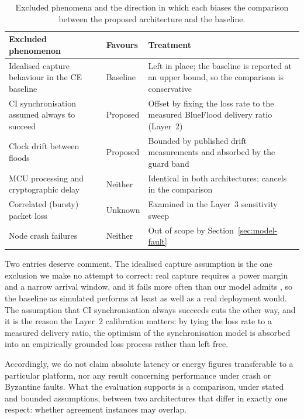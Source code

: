 \documentclass[journal]{IEEEtran}
\newcommand{\CI}{CI}                      %
\newcommand{\CE}{CE}                      %
\begin{document}
\begin{table}[!t]
\caption{Excluded phenomena and the direction in which each biases the
comparison between the proposed architecture and the baseline.}
\label{tab:bias}
\centering
\begin{tabular}{@{}p{}p{}p{}@{}}
\toprule
\textbf{Excluded phenomenon} & \textbf{Favours} & \textbf{Treatment} \\
\midrule
Idealised capture behaviour in the \CE{} baseline &
Baseline &
Left in place; the baseline is reported at an upper bound, so the
comparison is conservative \\
\addlinespace
\CI{} synchronisation assumed always to succeed &
Proposed &
Offset by fixing the loss rate to the measured BlueFlood delivery ratio
(Layer~2) \\
\addlinespace
Clock drift between floods &
Proposed &
Bounded by published drift measurements and absorbed by the guard band
\cite{baddeley23understanding} \\
\addlinespace
MCU processing and cryptographic delay &
Neither &
Identical in both architectures; cancels in the comparison \\
\addlinespace
Correlated (bursty) packet loss &
Unknown &
Examined in the Layer~3 sensitivity sweep \\
\addlinespace
Node crash failures &
Neither &
Out of scope by Section~\ref{sec:model-fault} \\
\bottomrule
\end{tabular}
\end{table}

Two entries deserve comment. The idealised capture assumption is the one
exclusion we make no attempt to correct: real capture requires a power
margin and a narrow arrival window, and it fails more often than our model
admits \cite{wilhelm14reception}, so the baseline as simulated performs at
least as well as a real deployment would. The assumption that \CI{}
synchronisation always succeeds cuts the other way, and it is the reason
the Layer~2 calibration matters: by tying the loss rate to a measured
delivery ratio, the optimism of the synchronisation model is absorbed
into an empirically grounded loss process rather than left free.

Accordingly, we do not claim absolute latency or energy figures
transferable to a particular platform, nor any result concerning
performance under crash or Byzantine faults. What the evaluation supports
is a comparison, under stated and bounded assumptions, between two
architectures that differ in exactly one respect: whether agreement
instances may overlap.
\end{document}
